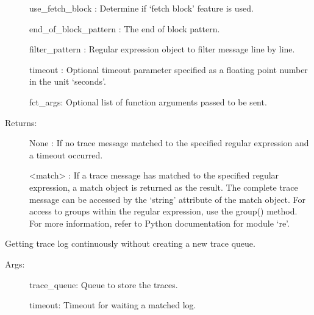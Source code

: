 \documentclass[letterpaper,10pt,english]{sphinxmanual}
\begin{document}
\begin{fulllineitems}
\begin{fulllineitems}
\begin{description}
\sphinxAtStartPar
use\_fetch\_block : Determine if ‘fetch block’ feature is used.

\sphinxAtStartPar
end\_of\_block\_pattern : The end of block pattern.

\sphinxAtStartPar
filter\_pattern : Regular expression object to filter message line by line.

\sphinxAtStartPar
timeout :   Optional timeout parameter specified as a floating point number in the unit ‘seconds’.

\sphinxAtStartPar
fct\_args:   Optional list of function arguments passed to be sent.

\item[{Returns:}] \leavevmode
\sphinxAtStartPar
None :    If no trace message matched to the specified regular expression and a timeout occurred.

\sphinxAtStartPar
\textless{}match\textgreater{} : If a trace message has matched to the specified regular expression, a match object is returned as the result.                    The complete trace message can be accessed by the ‘string’ attribute of the match object.                    For access to groups within the regular expression, use the group() method.                    For more information, refer to Python documentation for module ‘re’.

\end{description}

\end{fulllineitems}


\begin{fulllineitems}
\label{\detokenize{QConnectionLibrary:QConnectionLibrary.connection_base.ConnectionBase.wait_4_trace_continuously}}
\sphinxAtStartPar
Getting trace log continuously without creating a new trace queue.
\begin{description}
\item[{Args:}] \leavevmode
\sphinxAtStartPar
trace\_queue: Queue to store the traces.

\sphinxAtStartPar
timeout: Timeout for waiting a matched log.


\end{description}
\end{fulllineitems}
\end{fulllineitems}
\end{document}

